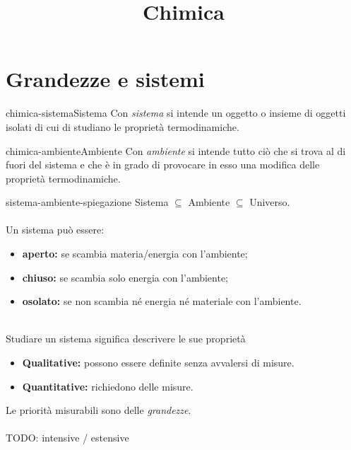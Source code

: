 \documentclass[preview]{standalone}
\begin{document}
\title{Chimica}
\genpage

\section{Grandezze e sistemi}

\begin{snippetdefinition}{chimica-sistema}{Sistema}
    Con \textit{sistema}
    si intende un oggetto o insieme di oggetti isolati
    di cui di studiano le proprietà termodinamiche.
\end{snippetdefinition}

\begin{snippetdefinition}{chimica-ambiente}{Ambiente}
    Con \textit{ambiente} si intende tutto ciò che si
    trova al di fuori del sistema e che è in grado
    di provocare in esso una modifica delle proprietà
    termodinamiche.
\end{snippetdefinition}

\begin{snippet}{sistema-ambiente-spiegazione}
Sistema \(\subseteq\) Ambiente \(\subseteq\) Universo.
\\\\
Un sistema può essere:
\begin{itemize}
    \item \textbf{aperto:} se scambia materia/energia con l'ambiente;
    \item \textbf{chiuso:} se scambia solo energia con l'ambiente;
    \item \textbf{osolato:} se non scambia né energia né materiale con l'ambiente.
\end{itemize}
\phantom{}\\
Studiare un sistema significa descrivere le sue proprietà
\begin{itemize}
    \item \textbf{Qualitative:} possono essere definite senza avvalersi
    di misure.
    \item \textbf{Quantitative:} richiedono delle misure.
\end{itemize}
Le priorità misurabili sono delle \textit{grandezze}.
\\\\
TODO: intensive / estensive
\end{snippet}
\end{document}
